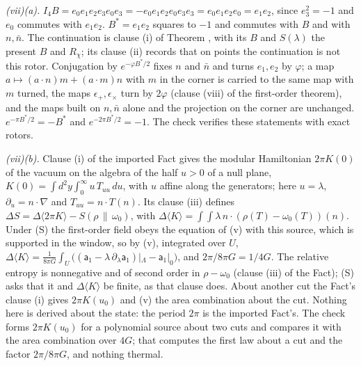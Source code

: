 \emph{(vii)(a).} $I_{4}B = e_{0}e_{1}e_{2}e_{3}e_{0}e_{3} = -e_{0}e_{1}e_{2}e_{0}e_{3}e_{3} = e_{0}e_{1}e_{2}e_{0} = e_{1}e_{2}$, since $e_{3}^{2} = -1$ and $e_{0}$ commutes with $e_{1}e_{2}$. $B^{*} = e_{1}e_{2}$ squares to $-1$ and commutes with $B$ and with $n, \bar n$. The continuation is clause (i) of Theorem , with its $B$ and $S(\lambda)$ the present $B$ and $R_{\chi}$; its clause (ii) records that on points the continuation is not this rotor. Conjugation by $e^{-\varphi B^{*}/2}$ fixes $n$ and $\bar n$ and turns $e_{1}, e_{2}$ by $\varphi$; a map $a \mapsto (a \cdot n)m + (a \cdot m)n$ with $m$ in the corner is carried to the same map with $m$ turned, the maps $\epsilon_{+}, \epsilon_{\times}$ turn by $2\varphi$ (clause (viii) of the first-order theorem), and the maps built on $n, \bar n$ alone and the projection on the corner are unchanged. $e^{-\pi B^{*}/2} = -B^{*}$ and $e^{-2\pi B^{*}/2} = -1$. The check verifies these statements with exact rotors.

\emph{(vii)(b).} Clause (i) of the imported Fact  gives the modular Hamiltonian $2\pi K(0)$ of the vacuum on the algebra of the half $u > 0$ of a null plane, $K(0) = \int d^{2}y\int_{0}^{\infty}u\,T_{uu}\,du$, with $u$ affine along the generators; here $u = \lambda$, $\partial_{u} = n \cdot \nabla$ and $T_{uu} = n \cdot T(n)$. Its clause (iii) defines $\Delta S = \Delta\langle 2\pi K\rangle - S(\rho\,\|\,\omega_{0})$, with $\Delta\langle K\rangle = \int\!\!\int\lambda\,n \cdot (\rho(T) - \omega_{0}(T))(n)$. Under (S) the first-order field obeys the equation of (v) with this source, which is supported in the window, so by (v), integrated over $U$, $\Delta\langle K\rangle = \tfrac{1}{8\pi G}\int_{U}\bigl((\mathsf{a}_{1} - \lambda\,\partial_{\lambda}\mathsf{a}_{1})|_{\Lambda} - \mathsf{a}_{1}|_{0}\bigr)$, and $2\pi/8\pi G = 1/4G$. The relative entropy is nonnegative and of second order in $\rho - \omega_{0}$ (clause (iii) of the Fact); (S) asks that it and $\Delta\langle K\rangle$ be finite, as that clause does. About another cut the Fact's clause (i) gives $2\pi K(u_{0})$ and (v) the area combination about the cut. Nothing here is derived about the state: the period $2\pi$ is the imported Fact's. The check forms $2\pi K(u_{0})$ for a polynomial source about two cuts and compares it with the area combination over $4G$; that computes the first law about a cut and the factor $2\pi/8\pi G$, and nothing thermal.
